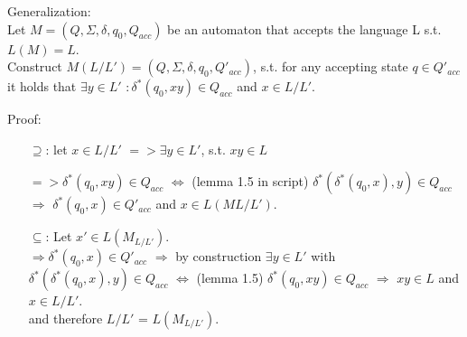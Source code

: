 Generalization:\\
Let $M = (Q, \Sigma, \delta, q_0, Q_{acc})$ be an automaton that accepts the language L s.t. $L(M) = L$.\\
Construct $M(L/L') = (Q, \Sigma, \delta, q_0, Q'_{acc})$, s.t. for any accepting state $q \in Q'_{acc}$  it holds that  $\exists y \in L'$  $: \delta^*(q_0,xy) \in Q_{acc}$ and $x \in L/L'$.

Proof:
\begin{itemize}
    \item[$\supseteq$:] let $x \in L / L'$
      $=> \exists y \in L'$, s.t. $xy \in L$

     $ => \delta^{*}(q_0 , xy) \in Q_{acc}$ $\Leftrightarrow$ (lemma 1.5 in script) $ \delta^{*}(\delta^{*}(q_0, x),y) \in Q_{acc}$  $\Rightarrow$ $ \delta^{*}(q_0,x) \in Q'_{acc}$ and $x \in L(M{L/L'})$.

    \item[$\subseteq$:] Let $x' \in L(M_{L/L'})$.\\
    $\Rightarrow \delta^{*}(q_0, x) \in Q'_{acc}$ $\Rightarrow$ by construction $\exists y \in L'$ with $\delta^{*}(\delta^{*}(q_0,x), y) \in Q_{acc}$ $\Leftrightarrow$ (lemma 1.5) $\delta^{*}(q_0, xy) \in Q_{acc}$ $\Rightarrow$ $xy \in L$ and $x \in L / L'$. \\
and therefore $L/L'$ = $L(M_{L/L'})$. \qedsymbol{}

\end{itemize}



